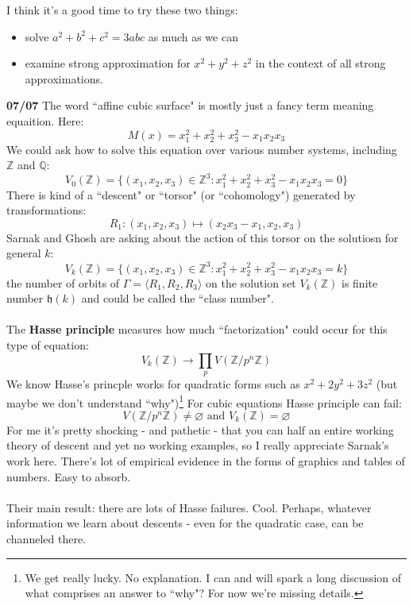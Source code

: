 \documentclass[12pt]{article}
\begin{document}
\noindent I think it's a good time to try these two things:
\begin{itemize}
\item solve $ a^2 + b^2 + c^2  = 3abc $ as much as we can
\item examine strong approximation for $x^2 + y^2 + z^2$ in the context of all strong approximations.
\end{itemize}
\textbf{07/07} The word ``affine cubic surface" is mostly just a fancy term meaning equaition.  Here:
$$ M(x) = x_1^2 + x_2^2 + x_3^2 - x_1 x_2 x_3 $$
We could ask how to solve this equation over various number systems, including $\mathbb{Z}$ and $\mathbb{Q}$:
$$  V_0(\mathbb{Z}) = \big\{ (x_1, x_2, x_3) \in \mathbb{Z}^3 :  x_1^2 + x_2^2 + x_3^2 - x_1 x_2 x_3 = 0 \big\} $$
There is kind of a ``descent" or ``torsor" (or ``cohomology") generated by transformations:
$$ R_1 :(x_1, x_2, x_3) \mapsto (x_2 x_3 - x_1, x_2, x_3)  $$
Sarnak and Ghosh are asking about the action of this torsor on the solutiosn for general $k$:
$$  V_k(\mathbb{Z}) = \big\{ (x_1, x_2, x_3) \in \mathbb{Z}^3 :  x_1^2 + x_2^2 + x_3^2 - x_1 x_2 x_3 = k \big\} $$
the number of orbits of $\Gamma = \langle R_1, R_2, R_3 \rangle $ on the solution set $V_k(\mathbb{Z})$ is finite number  $\mathfrak{h}(k)$ and could be called the ``class number". \\ \\
The \textbf{Hasse principle}  measures how much ``factorization" could occur for this type of equation:
$$   V_k(\mathbb{Z}) \to \prod_p V(\mathbb{Z}/p^n\mathbb{Z})    $$
We know Hasse's princple works for quadratic forms such as $x^2 + 2y^2 + 3z^2$ (but maybe we don't understand ``why")\footnote{We get really lucky. No explanation. I can and will spark a long discussion of what comprises an answer to ``why"?  For now we're missing details.   }  For cubic equations Hasse principle can fail:
$$V(\mathbb{Z}/p^n\mathbb{Z})  \neq \varnothing \text{ and }   V_k(\mathbb{Z}) = \varnothing $$
For me it's pretty shocking - and pathetic - that you can half an entire working theory of descent and yet no working examples, so I really appreciate Sarnak's work here.  There's lot of empirical evidence in the forms of graphics and tables of numbers.  Easy to absorb. \\ \\
Their main result: {\color{green!50!red!50!orange}there are lots of Hasse failures}.  Cool. Perhaps, whatever information we learn about descents - even for the quadratic case, can be channeled there.
\end{document}
